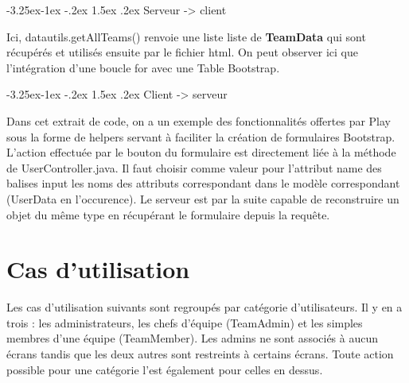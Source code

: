 \documentclass[french]{article}
\makeatletter
\renewcommand\paragraph{\@startsection{paragraph}{4}{\z@}%
                                     {-3.25ex\@plus -1ex \@minus -.2ex}%
                                     {1.5ex \@plus .2ex}%
                                     {\normalfont\normalsize\bfseries}}
\makeatother
\begin{document}
\paragraph{Serveur -> client}



Ici, datautils.getAllTeams() renvoie une liste liste de \textbf{TeamData} qui sont récupérés et utilisés ensuite par le fichier html. On peut observer ici que l'intégration d'une boucle for avec une Table Bootstrap.

\paragraph{Client -> serveur}



Dans cet extrait de code, on a un exemple des fonctionnalités offertes par Play sous la forme de helpers servant à faciliter la création de formulaires Bootstrap. L'action effectuée par le bouton du formulaire est directement liée à la méthode de UserController.java. Il faut choisir comme valeur pour l'attribut name des balises input les noms des attributs correspondant dans le modèle correspondant (UserData en l'occurence).\newline
Le serveur est par la suite capable de reconstruire un objet du même type en récupérant le formulaire depuis la requête.
	
	
\newpage		
\section{Cas d'utilisation}
Les cas d'utilisation suivants sont regroupés par catégorie d'utilisateurs. Il y en a trois : les administrateurs, les chefs d'équipe (TeamAdmin) et les simples membres d'une équipe (TeamMember). Les admins ne sont associés à aucun écrans tandis que les deux autres sont restreints à certains écrans.
Toute action possible pour une catégorie l'est également pour celles en dessus. 
\end{document}
